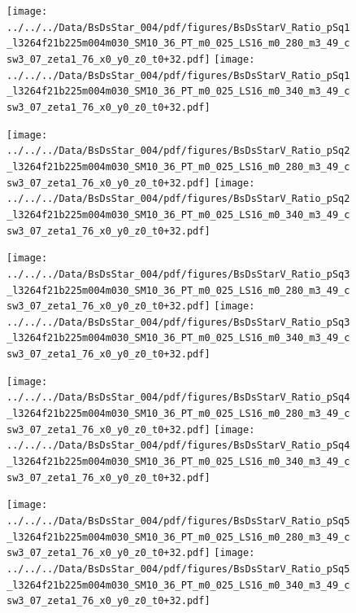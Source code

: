 \documentclass[a4paper,10pt]{article}
\begin{document}
\begin{figure}[p]
 \texttt{[image: ../../../Data/BsDsStar\_004/pdf/figures/BsDsStarV\_Ratio\_pSq1\_l3264f21b225m004m030\_SM10\_36\_PT\_m0\_025\_LS16\_m0\_280\_m3\_49\_csw3\_07\_zeta1\_76\_x0\_y0\_z0\_t0+32.pdf]} 
 \texttt{[image: ../../../Data/BsDsStar\_004/pdf/figures/BsDsStarV\_Ratio\_pSq1\_l3264f21b225m004m030\_SM10\_36\_PT\_m0\_025\_LS16\_m0\_340\_m3\_49\_csw3\_07\_zeta1\_76\_x0\_y0\_z0\_t0+32.pdf]} 
 \end{figure}
\begin{figure}[p]
 \texttt{[image: ../../../Data/BsDsStar\_004/pdf/figures/BsDsStarV\_Ratio\_pSq2\_l3264f21b225m004m030\_SM10\_36\_PT\_m0\_025\_LS16\_m0\_280\_m3\_49\_csw3\_07\_zeta1\_76\_x0\_y0\_z0\_t0+32.pdf]} 
 \texttt{[image: ../../../Data/BsDsStar\_004/pdf/figures/BsDsStarV\_Ratio\_pSq2\_l3264f21b225m004m030\_SM10\_36\_PT\_m0\_025\_LS16\_m0\_340\_m3\_49\_csw3\_07\_zeta1\_76\_x0\_y0\_z0\_t0+32.pdf]} 
 \end{figure}
\begin{figure}[p]
 \texttt{[image: ../../../Data/BsDsStar\_004/pdf/figures/BsDsStarV\_Ratio\_pSq3\_l3264f21b225m004m030\_SM10\_36\_PT\_m0\_025\_LS16\_m0\_280\_m3\_49\_csw3\_07\_zeta1\_76\_x0\_y0\_z0\_t0+32.pdf]} 
 \texttt{[image: ../../../Data/BsDsStar\_004/pdf/figures/BsDsStarV\_Ratio\_pSq3\_l3264f21b225m004m030\_SM10\_36\_PT\_m0\_025\_LS16\_m0\_340\_m3\_49\_csw3\_07\_zeta1\_76\_x0\_y0\_z0\_t0+32.pdf]} 
 \end{figure}
\clearpage
\begin{figure}[p]
 \texttt{[image: ../../../Data/BsDsStar\_004/pdf/figures/BsDsStarV\_Ratio\_pSq4\_l3264f21b225m004m030\_SM10\_36\_PT\_m0\_025\_LS16\_m0\_280\_m3\_49\_csw3\_07\_zeta1\_76\_x0\_y0\_z0\_t0+32.pdf]} 
 \texttt{[image: ../../../Data/BsDsStar\_004/pdf/figures/BsDsStarV\_Ratio\_pSq4\_l3264f21b225m004m030\_SM10\_36\_PT\_m0\_025\_LS16\_m0\_340\_m3\_49\_csw3\_07\_zeta1\_76\_x0\_y0\_z0\_t0+32.pdf]} 
 \end{figure}
\begin{figure}[p]
 \texttt{[image: ../../../Data/BsDsStar\_004/pdf/figures/BsDsStarV\_Ratio\_pSq5\_l3264f21b225m004m030\_SM10\_36\_PT\_m0\_025\_LS16\_m0\_280\_m3\_49\_csw3\_07\_zeta1\_76\_x0\_y0\_z0\_t0+32.pdf]} 
 \texttt{[image: ../../../Data/BsDsStar\_004/pdf/figures/BsDsStarV\_Ratio\_pSq5\_l3264f21b225m004m030\_SM10\_36\_PT\_m0\_025\_LS16\_m0\_340\_m3\_49\_csw3\_07\_zeta1\_76\_x0\_y0\_z0\_t0+32.pdf]} 
 \end{figure}
\clearpage
\end{document}
